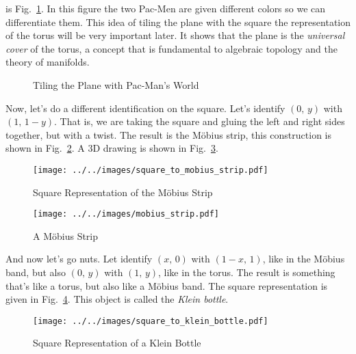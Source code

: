 \documentclass{article}
\theoremstyle{plain}
\theoremstyle{normal}
\begin{document}
        is Fig.~\ref{fig:plane_torus_pacman}. In this figure the two Pac-Men are
        given different colors so we can differentiate them. This idea of tiling
        the plane with the square the representation of the torus will be very
        important later. It shows that the plane is the
        \textit{universal cover} of the torus, a concept that is fundamental
        to algebraic topology and the theory of manifolds.
        \begin{figure}
            \centering
            \caption{Tiling the Plane with Pac-Man's World}
            \label{fig:plane_torus_pacman}
        \end{figure}
        \par\hfill\par
        Now, let's do a different identification on the square. Let's identify
        $(0,\,y)$ with $(1,\,1-y)$. That is, we are taking the square and
        gluing the left and right sides together, but with a twist. The
        result is the M\"{o}bius strip, this construction is shown in
        Fig.~\ref{fig:square_to_mobius_strip}. A 3D drawing is shown in
        Fig.~\ref{fig:mobius_strip}.
        \begin{figure}
            \centering
            \texttt{[image: ../../images/square\_to\_mobius\_strip.pdf]}
            \caption{Square Representation of the M\"{o}bius Strip}
            \label{fig:square_to_mobius_strip}
        \end{figure}
        \begin{figure}
            \centering
            \texttt{[image: ../../images/mobius\_strip.pdf]}
            \caption{A M\"{o}bius Strip}
            \label{fig:mobius_strip}
        \end{figure}
        \par\hfill\par
        And now let's go nuts. Let identify
        $(x,\,0)$ with $(1-x,\,1)$, like in the M\"{o}bius band, but also
        $(0,\,y)$ with $(1,\,y)$, like in the torus. The result is something
        that's like a torus, but also like a M\"{o}bius band. The square
        representation is given in Fig.~\ref{fig:square_to_klein_bottle}.
        This object is called the \textit{Klein bottle}.
        \begin{figure}
            \centering
            \texttt{[image: ../../images/square\_to\_klein\_bottle.pdf]}
            \caption{Square Representation of a Klein Bottle}
            \label{fig:square_to_klein_bottle}
        \end{figure}
\end{document}
